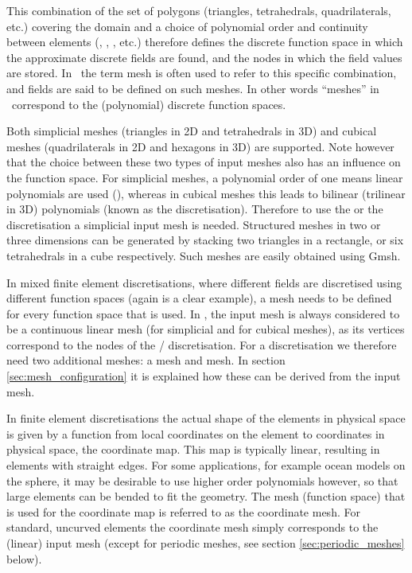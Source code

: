 This combination of the set of polygons (triangles, tetrahedrals, 
quadrilaterals, etc.) covering the domain 
and a choice of polynomial order and continuity between
elements (\Pone, \PoDG, \Ptwo, etc.) therefore defines the discrete function 
space in which the approximate discrete fields are found, and the nodes
in which the field values are stored. In \fluidity\ 
the term mesh is often used to refer to this specific combination, and fields are said
to be defined on such meshes. In other words ``meshes'' in \fluidity\ correspond
to the (polynomial) discrete function spaces.

Both simplicial meshes (triangles in 2D and tetrahedrals in 3D) and cubical
meshes (quadrilaterals in 2D and hexagons in 3D) are supported. Note however
that the choice between these two types of input meshes also has an influence
on the function space. For simplicial meshes, a polynomial order
of one means linear polynomials are used (\Pone), whereas in cubical meshes this
leads to bilinear (trilinear in 3D) polynomials (known as the \Qone
discretisation). Therefore to use 
the \Poo or the \PoDGPt discretisation 
a simplicial input mesh is needed. Structured meshes in two
or three dimensions can be generated by stacking two triangles in a rectangle,
or six tetrahedrals in a cube respectively. Such meshes are easily obtained
using Gmsh.

In mixed finite element discretisations, where different fields are discretised
using different function spaces (again \PoDGPt is a clear example), a mesh needs
to be defined for every function space that is used. In \fluidity, 
the input mesh is always considered to be a 
continuous linear mesh (\Pone for simplicial and \Qone for
cubical meshes), as its vertices correspond to the nodes of the \Pone/\Qone
discretisation. For a \PoDGPt discretisation we therefore need two additional
meshes: a \PoDG mesh and \Ptwo mesh. In section \ref{sec:mesh_configuration} it
is explained how these can be derived from the input mesh.

In finite element discretisations the actual shape of the elements in physical
space is given by a function from local coordinates on the element to
coordinates in physical space, the coordinate map. This map is typically linear,
resulting in elements with straight edges. For some applications, for example
ocean models on the sphere, it may be desirable to use higher order
polynomials however, so that large elements can be bended to fit the
geometry. The mesh (function space) that is used for the coordinate map is
referred to as the coordinate mesh. For standard, uncurved elements 
the coordinate mesh simply corresponds to the (linear) input mesh
(except for periodic meshes, see section \ref{sec:periodic_meshes} below).

